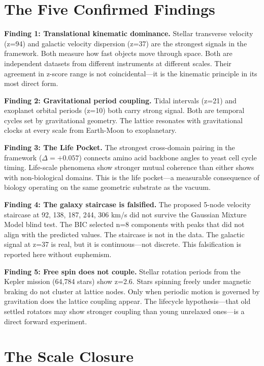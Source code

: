 \documentclass[11pt, letterpaper, openany]{book}
\begin{document}
\section*{The Five Confirmed Findings}

\textbf{Finding 1: Translational kinematic dominance.}
Stellar transverse velocity (z=94) and galactic velocity dispersion (z=37) are the strongest
signals in the framework. Both measure how fast objects move through space. Both are independent
datasets from different instruments at different scales. Their agreement in z-score range is not
coincidental---it is the kinematic principle in its most direct form.

\textbf{Finding 2: Gravitational period coupling.}
Tidal intervals (z=21) and exoplanet orbital periods (z=10) both carry strong signal. Both
are temporal cycles set by gravitational geometry. The lattice resonates with gravitational
clocks at every scale from Earth-Moon to exoplanetary.

\textbf{Finding 3: The Life Pocket.}
The strongest cross-domain pairing in the framework ($\Delta = +0.057$) connects amino acid
backbone angles to yeast cell cycle timing. Life-scale phenomena show stronger mutual coherence
than either shows with non-biological domains. This is the life pocket---a measurable
consequence of biology operating on the same geometric substrate as the vacuum.

\textbf{Finding 4: The galaxy staircase is falsified.}
The proposed 5-node velocity staircase at 92, 138, 187, 244, 306 km/s did not survive the
Gaussian Mixture Model blind test. The BIC selected n=8 components with peaks that did not
align with the predicted values. The staircase is not in the data. The galactic signal at
z=37 is real, but it is continuous---not discrete. This falsification is reported here
without euphemism.

\textbf{Finding 5: Free spin does not couple.}
Stellar rotation periods from the Kepler mission (64,784 stars) show z=2.6. Stars spinning
freely under magnetic braking do not cluster at lattice nodes. Only when periodic motion is
governed by gravitation does the lattice coupling appear. The lifecycle hypothesis---that old
settled rotators may show stronger coupling than young unrelaxed ones---is a direct forward
experiment.

\section*{The Scale Closure}
\end{document}
